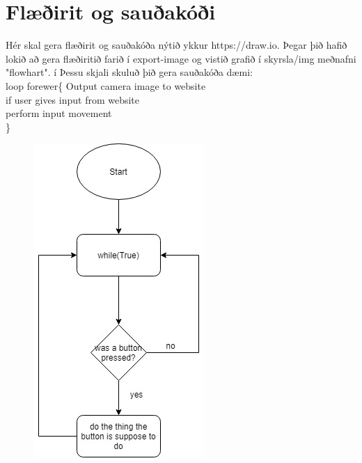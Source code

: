 \section{Flæðirit og sauðakóði}Hér skal gera flæðirit og sauðakóða nýtið ykkur https://draw.io. Þegar þið hafið lokið að gera flæðiritið farið í export-image og vistið grafið í skyrsla/img meðnafni "flowhart". í Þessu skjali skuluð þið gera sauðakóða 
dæmi:\\
loop forewer\{
  Output camera image to website\\
   if user gives input from website\\
   perform input movement\\
\}
\begin{figure}[h]
\includegraphics[scale=.3]{img/Diagram}
\end{figure}
